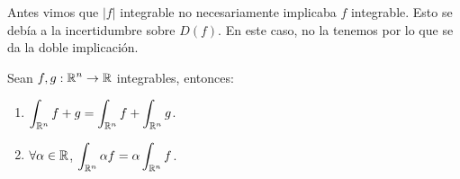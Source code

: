 \begin{observation}
Antes vimos que $\displaystyle \left|f\right| $ integrable no necesariamente implicaba $\displaystyle f $ integrable. Esto se debía a la incertidumbre sobre $\displaystyle D\left(f\right) $. En este caso, no la tenemos por lo que se da la doble implicación. 
\end{observation}
\begin{prop}[Linealidad]
Sean $\displaystyle f,g : \mathbb{R}^{n}\to \mathbb{R} $ integrables, entonces:
\begin{enumerate}
\item $\displaystyle \int _{\mathbb{R}^{n}}f + g =\int _{\mathbb{R}^{n}}f +\int _{\mathbb{R}^{n}}g $.
\item $\displaystyle \forall \alpha \in \mathbb{R} $, $\displaystyle \int _{\mathbb{R}^{n}}\alpha f =\alpha\int _{\mathbb{R}^{n}}f $. 
\end{enumerate}
\end{prop}
